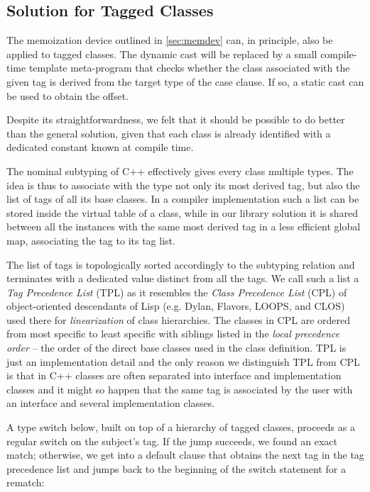 \subsection{Solution for Tagged Classes}
\label{sec:cotc}

The memoization device outlined in \textsection\ref{sec:memdev} can, in principle, also be 
applied to tagged classes. The dynamic cast will be replaced by a small 
compile-time template meta-program that checks whether the class associated with 
the given tag is derived from the target type of the case clause. If so, a static 
cast can be used to obtain the offset.

Despite its straightforwardness, we felt that it should be possible to do better 
than the general solution, given that each class is already identified with a 
dedicated constant known at compile time.

The nominal subtyping of C++ effectively gives every class multiple types. The 
idea is thus to associate with the type not only its most derived tag, but also 
the list of tags of all its base classes. In a compiler implementation such a 
list can be stored inside the virtual table of a class, while in our library 
solution it is shared between all the instances with the same most derived tag 
in a less efficient global map, associating the tag to its tag list.

The list of tags is topologically sorted accordingly to the subtyping relation 
and terminates with a dedicated value distinct from all the tags. We call such a 
list a \emph{Tag Precedence List} (TPL) as it resembles the \emph{Class 
Precedence List} (CPL) of object-oriented descendants of Lisp (e.g. Dylan, 
Flavors, LOOPS, and CLOS) used there for \emph{linearization} of class 
hierarchies. The classes in CPL are ordered from most specific to least specific 
with siblings listed in the \emph{local precedence order} -- the order of the 
direct base classes used in the class definition. TPL is just an implementation 
detail and the only reason we distinguish TPL from CPL is that in C++ classes 
are often separated into interface and implementation classes and it might so 
happen that the same tag is associated by the user with an interface and several 
implementation classes. 

A type switch below, built on top of a hierarchy of tagged classes, proceeds as 
a regular switch on the subject's tag. If the jump succeeds, we found an exact 
match; otherwise, we get into a default clause that obtains the next tag in the 
tag precedence list and jumps back to the beginning of the switch statement for a 
rematch:

